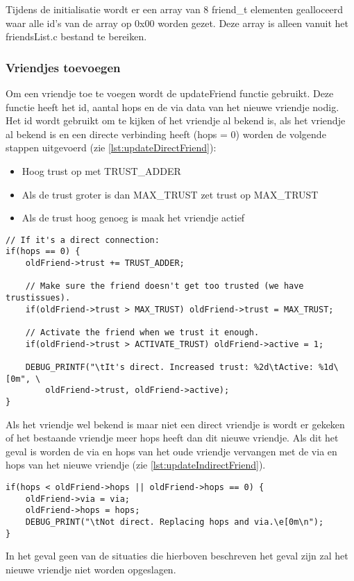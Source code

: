         Tijdens de initialisatie wordt er een array van 8 friend\_t elementen gealloceerd waar alle id's van de array op 0x00 worden gezet. Deze array is alleen vanuit het friendsList.c bestand te bereiken.

    \subsubsection{Vriendjes toevoegen}
        Om een vriendje toe te voegen wordt de updateFriend functie gebruikt. Deze functie heeft het id, aantal hops en de via data van het nieuwe vriendje nodig. Het id wordt gebruikt om te kijken of het vriendje al bekend is, als het vriendje al bekend is en een directe verbinding heeft (hops = 0) worden de volgende stappen uitgevoerd (zie \autoref{lst:updateDirectFriend}):
        \begin{itemize}
            \item Hoog trust op met TRUST\_ADDER
            \item Als de trust groter is dan MAX\_TRUST zet trust op MAX\_TRUST
            \item Als de trust hoog genoeg is maak het vriendje actief
        \end{itemize}
\begin{lstlisting}[caption={Update direct vriendje},captionpos=b,label={lst:updateDirectFriend},style=c,xleftmargin=.\textwidth,xrightmargin=.\textwidth]
// If it's a direct connection:
if(hops == 0) {
    oldFriend->trust += TRUST_ADDER;

    // Make sure the friend doesn't get too trusted (we have trustissues).
    if(oldFriend->trust > MAX_TRUST) oldFriend->trust = MAX_TRUST;

    // Activate the friend when we trust it enough.
    if(oldFriend->trust > ACTIVATE_TRUST) oldFriend->active = 1;

    DEBUG_PRINTF("\tIt's direct. Increased trust: %2d\tActive: %1d\[0m", \ 
        oldFriend->trust, oldFriend->active);
}
\end{lstlisting}
        Als het vriendje wel bekend is maar niet een direct vriendje is wordt er gekeken of het bestaande vriendje meer hops heeft dan dit nieuwe vriendje. Als dit het geval is worden de via en hops van het oude vriendje vervangen met de via en hops van het nieuwe vriendje (zie \autoref{lst:updateIndirectFriend}). 
\begin{lstlisting}[caption={Update indirect vriendje},captionpos=b,label={lst:updateIndirectFriend},style=c,xleftmargin=.\textwidth,xrightmargin=.\textwidth]
if(hops < oldFriend->hops || oldFriend->hops == 0) {
    oldFriend->via = via;
    oldFriend->hops = hops;
    DEBUG_PRINT("\tNot direct. Replacing hops and via.\e[0m\n");
}
\end{lstlisting}
        In het geval geen van de situaties die hierboven beschreven het geval zijn zal het nieuwe vriendje niet worden opgeslagen.

